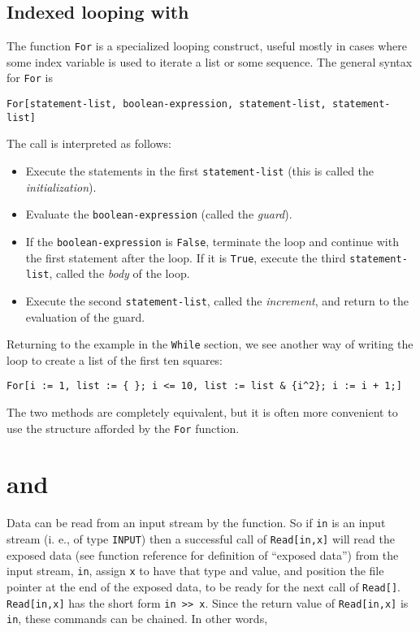 \subsection{Indexed looping with }

The function \verb+For+ is a specialized looping construct, useful
mostly in cases where some index variable is used to iterate a list or
some sequence.  The general syntax for \verb+For+ is

\begin{verbatim}
For[statement-list, boolean-expression, statement-list, statement-list]
\end{verbatim}

\noindent The call is interpreted as follows:
\begin{itemize}
\item Execute the statements in the first \verb+statement-list+ (this
is called the {\em initialization}).
\item Evaluate the \verb+boolean-expression+ (called the {\em guard}).
\item If the \verb+boolean-expression+ is \verb+False+, terminate the
loop and continue with the first statement after the loop.  If it is
\verb+True+, execute the third \verb+statement-list+, called the {\em
body} of the loop.
\item Execute the second \verb+statement-list+, called the {\em
increment}, and return to the evaluation of the guard.
\end{itemize}

Returning to the example in the \verb+While+ section, we see another
way of writing the loop to create a list of the first ten squares:

\begin{verbatim}
For[i := 1, list := { }; i <= 10, list := list & {i^2}; i := i + 1;]
\end{verbatim}

\noindent The two methods are completely equivalent, but it is often
more convenient to use the structure afforded by the \verb+For+
function.

\section{ and }

Data can be read from an input stream by the  function.
So if \verb+in+ is an input stream (i. e., of type \verb+INPUT+) then
a successful call of \verb+Read[in,x]+ will read the exposed data (see
function reference for definition of ``exposed data'') from the input
stream, \verb+in+, assign \verb+x+ to have that type and value, and
position the file pointer at the end of the exposed data, to be ready
for the next call of \verb+Read[]+.  \verb+Read[in,x]+ has the short
form \verb+in >> x+.  Since the return value of \verb+Read[in,x]+ is
\verb+in+, these commands can be chained.  In other words,

